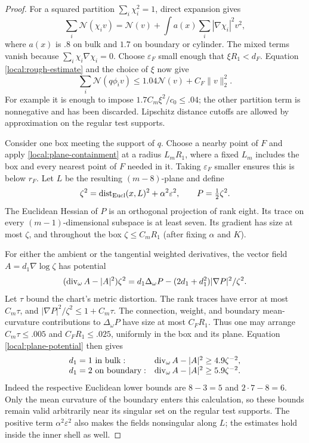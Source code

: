 \begin{proof}
For a squared partition $\sum_i\chi_i^2=1$, direct expansion gives
\begin{equation}\label{local:localization-identity}
 \sum_i\mathcal N(\chi_iv)
 =\mathcal N(v)+
   \int a(x)\sum_i|\nabla\chi_i|^2v^2,
\end{equation}
where $a(x)$ is $.8$ on bulk and $1.7$ on boundary or cylinder.
The mixed terms vanish because $\sum_i\chi_i\nabla\chi_i=0$.
Choose $\varepsilon_F$ small enough that $\xi R_1<d_F$.
Equation \eqref{local:rough-estimate} and the choice of $\xi$ now
give
\begin{equation}\label{local:localization}
 \sum_i\mathcal N(q\phi_iv)
 \le1.04\mathcal N(v)+C_F\|v\|_2^2.
\end{equation}
For example it is enough to impose
$1.7C_m\xi^2/c_0\le.04$; the other partition term is nonnegative
and has been discarded.  Lipschitz distance cutoffs are allowed by
approximation on the regular test supports.

Consider one box meeting the support of $q$.  Choose a nearby point
of $F$ and apply \eqref{local:plane-containment} at a radius $L_mR_1$,
where a fixed $L_m$ includes the box and every nearest point of
$F$ needed in it.  Taking $\varepsilon_F$ smaller ensures this is
below $r_F$.  Let $L$ be the resulting $(m-8)$-plane and define
\[
 \zeta^2=\operatorname{dist}_{\rm Eucl}(x,L)^2+\alpha^2\varepsilon^2,
 \qquad P=\tfrac12\zeta^2.
\]
The Euclidean Hessian of $P$ is an orthogonal projection of rank
eight.  Its trace on every $(m-1)$-dimensional subspace is at least
seven.  Its gradient has size at most $\zeta$, and throughout the
box $\zeta\le C_mR_1$ (after fixing $\alpha$ and $K$).

For either the ambient or the tangential weighted derivatives,
the vector field $A=d_1\nabla\log\zeta$ has potential
\begin{equation}\label{local:plane-potential}
 (\operatorname{div}_\omega A-|A|^2)\zeta^2
 =d_1\Delta_\omega P
       -(2d_1+d_1^2)|\nabla P|^2/\zeta^2.
\end{equation}
Let $\tau$ bound the chart's metric distortion.  The rank traces
have error at most $C_m\tau$, and
$|\nabla P|^2/\zeta^2\le1+C_m\tau$.  The connection, weight, and
boundary mean-curvature contributions to $\Delta_\omega P$ have size
at most $C_FR_1$.  Thus one may arrange
$C_m\tau\le .005$ and $C_FR_1\le .025$, uniformly in the box and
its plane.  Equation \eqref{local:plane-potential} then gives
\[
 \begin{array}{ll}
 d_1=1\text{ in bulk}:&
       \operatorname{div}_\omega A-|A|^2\ge4.9\zeta^{-2},\\
 d_1=2\text{ on boundary}:&
       \operatorname{div}_\omega A-|A|^2\ge5.9\zeta^{-2}.
 \end{array}
\]
Indeed the respective Euclidean lower bounds are $8-3=5$ and
$2\cdot7-8=6$.  Only the mean curvature of the boundary enters this
calculation, so these bounds remain valid arbitrarily near its
singular set on the regular test supports.  The positive term
$\alpha^2\varepsilon^2$ also makes the fields nonsingular along
$L$; the estimates hold inside the inner shell as well.


\end{proof}
